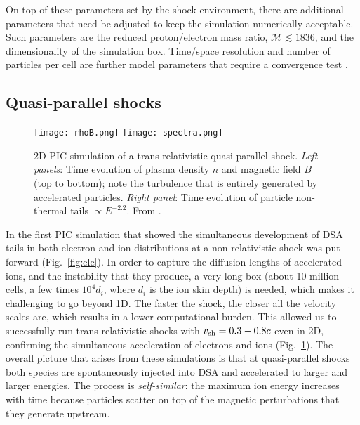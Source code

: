\documentclass[varenna]{cimento}
\newcommand{\vsh}{v_{\rm sh}}
\begin{document}
On top of these parameters set by the shock environment, there are additional parameters that need be adjusted to keep the simulation numerically acceptable. 
Such parameters are the reduced proton/electron mass ratio, $\mathcal{M}\lesssim 1836$, and the dimensionality of the simulation box. 
Time/space resolution and number of particles per cell are further model parameters that require a convergence test \cite{shalaby+17}.


\subsection{Quasi-parallel shocks}
\begin{figure}[t]
\centering
\texttt{[image: rhoB.png]}
\texttt{[image: spectra.png]}
 \caption{\label{fig:PIC}
2D PIC simulation of a trans-relativistic quasi-parallel shock.
 \emph{Left panels}: Time evolution of plasma density $n$ and magnetic field $B$ (top to bottom); note the turbulence that is entirely generated by accelerated particles.
\emph{Right panel}: Time evolution of particle non-thermal tails $\propto E^{-2.2}$. From \cite{crumley+19}.}
\vspace{-15pt}
\end{figure}

In \cite{park+15} the first PIC simulation that showed the simultaneous development of DSA tails in both electron and ion distributions at a non-relativistic shock was put forward (Fig.~\ref{fig:ele}).
In order to capture the diffusion lengths of accelerated ions, and the instability that they produce, a very long box (about 10 million cells, a few times $10^4d_i$, where $d_i$ is the ion skin depth) is needed, which makes it challenging to go beyond 1D. 
The faster the shock, the closer all the velocity scales are, which results in a lower computational burden.
This allowed us to successfully run trans-relativistic shocks with $\vsh=0.3-0.8c$ \cite{crumley+19} even in 2D, confirming the simultaneous acceleration of electrons and ions (Fig.~\ref{fig:PIC}).
The overall picture that arises from these simulations is that at quasi-parallel shocks both species are spontaneously injected into DSA and accelerated to larger and larger energies.
The process is \emph{self-similar}: the maximum ion energy increases with time because particles scatter on top of the magnetic perturbations that they generate upstream. 
\end{document}
